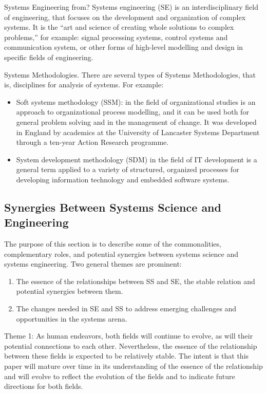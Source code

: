 Systems Engineering from? Systems engineering (SE) is an interdisciplinary field of engineering, that focuses on the development and organization of complex systems. It is the “art and science of creating whole solutions to complex problems,” for example: signal processing systems, control systems and communication system, or other forms of high-level modelling and design in specific fields of engineering.

Systems Methodologies. There are several types of Systems Methodologies, that is, disciplines for analysis of systems. For example:

\begin{itemize}
\item Soft systems methodology (SSM): in the field of organizational studies is an approach to organizational process modelling, and it can be used both for general problem solving and in the management of change. It was developed in England by academics at the University of Lancaster Systems Department through a ten-year Action Research programme.
\item System development methodology (SDM) in the field of IT development is a general term applied to a variety of structured, organized processes for developing information technology and embedded software systems.
\end{itemize}
    
\subsection{Synergies Between Systems Science and Engineering}

The purpose of this section is to describe some of the commonalities, complementary roles, and potential synergies between systems science and systems engineering. Two general themes are prominent:

\begin{enumerate}
\item The essence of the relationships between SS and SE, the stable relation and potential synergies between them.
\item The changes needed in SE and SS to address emerging challenges and opportunities in the systems arena.
\end{enumerate}

Theme 1: As human endeavors, both fields will continue to evolve, as will their potential connections to each other. Nevertheless, the essence of the relationship between these fields is expected to be relatively stable. The intent is that this paper will mature over time in its understanding of the essence of the relationship and will evolve to reflect the evolution of the fields and to indicate future directions for both fields.

